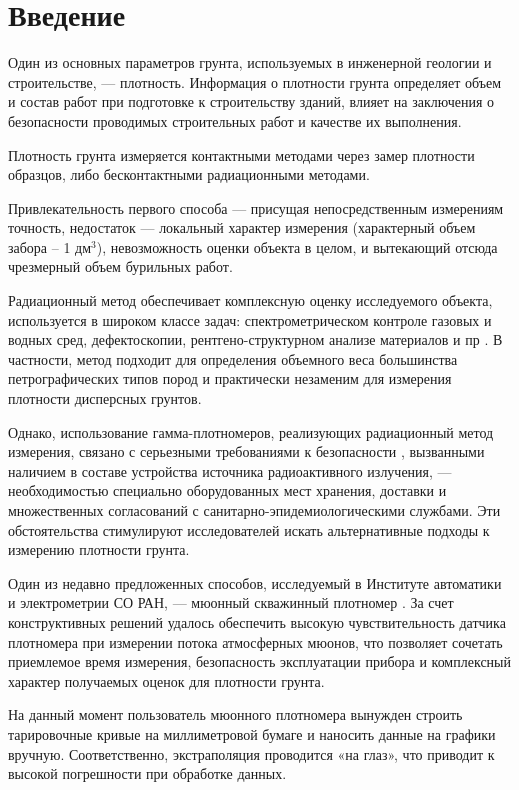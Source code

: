 \chapter*{Введение}							%

Один из основных параметров грунта, используемых в инженерной геологии и строительстве, ---
плотность. Информация о плотности грунта 
определяет объем и состав работ при подготовке к строительству зданий, влияет на заключения о 
безопасности проводимых строительных работ и качестве их выполнения\cite{gost5180, souzdornii}. 

Плотность грунта измеряется контактными методами через замер плотности образцов, 
либо бесконтактными радиационными методами.

Привлекательность первого способа --- присущая непосредственным измерениям точность, недостаток ---
локальный характер измерения (характерный объем забора – 1 дм$^{3}$), невозможность оценки объекта в целом,
и вытекающий отсюда чрезмерный объем бурильных работ.

Радиационный метод обеспечивает комплексную оценку исследуемого объекта, используется в широком классе задач:
спектрометрическом контроле газовых и водных сред, дефектоскопии, рентгено-структурном анализе материалов и пр \cite{gammaquant}. 
В частности, метод подходит для определения объемного веса большинства петрографических типов пород и практически 
незаменим для измерения плотности дисперсных грунтов. 

Однако, использование гамма-плотномеров, реализующих радиационный метод измерения, связано с серьезными требованиями 
к безопасности \cite{gost23061}, вызванными наличием в составе устройства источника радиоактивного излучения, --- необходимостью 
специально оборудованных мест хранения, доставки и множественных согласований с санитарно-эпидемиологическими службами. 
Эти обстоятельства стимулируют исследователей искать альтернативные подходы к измерению плотности грунта. 

Один из недавно предложенных способов, исследуемый в Институте автоматики и электрометрии СО РАН, ---
мюонный скважинный плотномер \cite{patentdensitometer}. За счет конструктивных решений удалось обеспечить высокую чувствительность 
датчика плотномера при измерении потока атмосферных мюонов, что позволяет сочетать приемлемое время измерения, 
безопасность эксплуатации прибора и комплексный характер получаемых оценок для плотности грунта.

На данный момент пользователь мюонного плотномера вынужден строить тарировочные кривые на миллиметровой бумаге 
и наносить данные на графики вручную. Соответственно, экстраполяция проводится «на глаз», что приводит к высокой 
погрешности при обработке данных.

